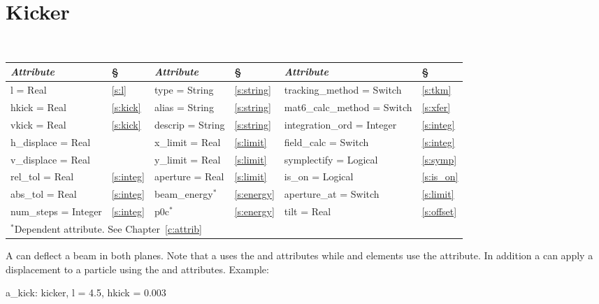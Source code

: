 {{%
\section{Kicker}
\label{s:kicker}

\begin{center}
\tt
\begin{tabular}{|l|l||l|l||l|l|} \hline
  {\sl Attribute} & \S & {\sl Attribute} & \S&  {\sl Attribute} & \S \\ \hline
  l        = Real       & \ref{s:l}       & type = String      & \ref{s:string} & tracking\_method = Switch    & \ref{s:tkm}    \\ \hline
  hkick    = Real       & \ref{s:kick}    & alias = String     & \ref{s:string} & mat6\_calc\_method = Switch  & \ref{s:xfer}   \\ \hline
  vkick    = Real       & \ref{s:kick}    & descrip = String   & \ref{s:string} & integration\_ord = Integer   & \ref{s:integ}  \\ \hline
  h\_displace = Real    &                 & x\_limit = Real    & \ref{s:limit}  & field\_calc = Switch         & \ref{s:integ}  \\ \hline 
  v\_displace = Real    &                 & y\_limit = Real    & \ref{s:limit}  & symplectify = Logical        & \ref{s:symp}   \\ \hline
  rel\_tol = Real       & \ref{s:integ}   & aperture = Real    & \ref{s:limit}  & is\_on = Logical             & \ref{s:is_on}  \\ \hline
  abs\_tol = Real       & \ref{s:integ}   & beam\_energy$^*$   & \ref{s:energy} & aperture\_at = Switch        & \ref{s:limit}  \\ \hline
  num\_steps = Integer  & \ref{s:integ}   & p0c$^*$            & \ref{s:energy} & tilt     = Real              & \ref{s:offset} \\ \hline
  \multicolumn{6}{l}{\small $^*$Dependent attribute. See Chapter~\ref{c:attrib}} \\
\end{tabular}
\end{center}
\toffset

A  can deflect a beam in both planes. Note that a
 uses the  and  attributes while
 and  elements use the  attribute. 
In addition a  can apply a displacement to a particle
using the  and  attributes.
Example:
\begin{example}
  a_kick: kicker, l = 4.5, hkick = 0.003
\end{example}

}}
